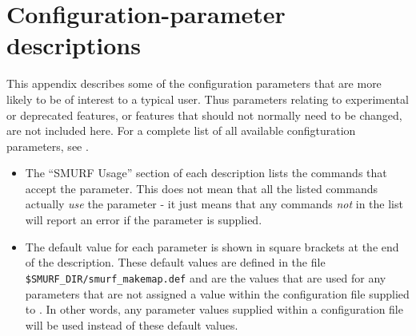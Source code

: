 \chapter{Configuration-parameter descriptions}
\label{app:parameters}

This appendix describes some of the \makemap configuration parameters
that are more likely to be of interest to a typical user. Thus parameters
relating to experimental or deprecated features, or features that should
not normally need to be changed, are not included here. For a complete list
of all available configturation parameters, see
.

\begin{itemize}
\item The ``SMURF Usage'' section of each description lists the \SMURF
commands that accept the parameter. This does not mean that all the
listed commands actually \emph{use} the parameter - it just means that
any commands \emph{not} in the list will report an error if the parameter
is supplied.
\item The default value for each parameter is shown in square brackets at
the end of the description. These default values are defined in the file
\texttt{\$SMURF\_DIR/smurf\_makemap.def} and are the values that are used
for any parameters that are not assigned a value within the configuration
file supplied to \makemap. In other words, any parameter values supplied
within a configuration file will be used instead of these default values.
\end{itemize}

\sstnomaintoc

\sstmaintoc

